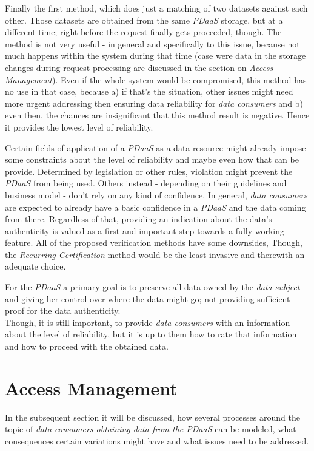 \documentclass[12pt,english,a4paper,titlepage,cleardoublepage=empty,dottedtoc]{report}
\begin{document}
Finally the first method, which does just a matching of two datasets
against each other. Those datasets are obtained from the same
\emph{PDaaS} storage, but at a different time; right before the request
finally gets proceeded, though. The method is not very useful - in
general and specifically to this issue, because not much happens within
the system during that time (case were data in the storage changes
during request processing are discussed in the section on
\emph{\protect\hyperlink{access-management}{Access Management}}). Even
if the whole system would be compromised, this method has no use in that
case, because a) if that's the situation, other issues might need more
urgent addressing then ensuring data reliability for \emph{data
consumers} and b) even then, the chances are insignificant that this
method result is negative. Hence it provides the lowest level of
reliability.

Certain fields of application of a \emph{PDaaS} as a data resource might
already impose some constraints about the level of reliability and maybe
even how that can be provide. Determined by legislation or other rules,
violation might prevent the \emph{PDaaS} from being used. Others instead
- depending on their guidelines and business model - don't rely on any
kind of confidence. In general, \emph{data consumers} are expected to
already have a basic confidence in a \emph{PDaaS} and the data coming
from there. Regardless of that, providing an indication about the data's
authenticity is valued as a first and important step towards a fully
working feature. All of the proposed verification methods have some
downsides, Though, the \emph{Recurring Certification} method would be
the least invasive and therewith an adequate choice.

For the \emph{PDaaS} a primary goal is to preserve all data owned by the
\emph{data subject} and giving her control over where the data might go;
not providing sufficient proof for the data authenticity.\\
Though, it is still important, to provide \emph{data consumers} with an
information about the level of reliability, but it is up to them how to
rate that information and how to proceed with the obtained data.

\hypertarget{access-management}{\section{Access
Management}\label{access-management}}

In the subsequent section it will be discussed, how several processes
around the topic of \emph{data consumers obtaining data from the PDaaS}
can be modeled, what consequences certain variations might have and what
issues need to be addressed.
\end{document}
